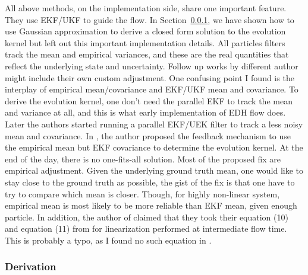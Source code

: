 \documentclass{article}
\begin{document}
All above methods, on the implementation side, share one important feature. They use EKF/UKF to guide the flow. In Section~\ref{sec:edh_derivation}, we have shown how to use Gaussian approximation to derive a closed form solution to the evolution kernel but left out this important implementation details. All particles filters track the mean and empirical variances, and these are the real quantities that reflect the underlying state and uncertainty. Follow up works by different author might include their own custom adjustment. One confusing point I found is the interplay of empirical mean/covariance and EKF/UKF mean and covariance. To derive the evolution kernel, one don't need the parallel EKF to track the mean and variance at all, and this is what early implementation of EDH flow does. Later the authors started running a parallel EKF/UEK filter to track a less noisy mean and covariance. In \cite{ding2012implementation}, the author proposed the feedback mechanism to use the empirical mean but EKF covariance to determine the evolution kernel. At the end of the day, there is no one-fits-all solution. Most of the proposed fix are empirical adjustment. Given the underlying ground truth mean, one would like to stay close to the ground truth as possible, the gist of the fix is that one have to try to compare which mean is closer. Though, for highly non-linear system, empirical mean is most likely to be more reliable than EKF mean, given enough particle. In addition, the author of \cite{Li-Particle-Filtering-2017} claimed that they took their equation (10) and equation (11) from \cite{ding2012implementation} for linearization performed at intermediate flow time. This is probably a typo, as I found no such equation in \cite{ding2012implementation}.

\subsubsection{Derivation}

\label{sec:edh_derivation}
\end{document}
